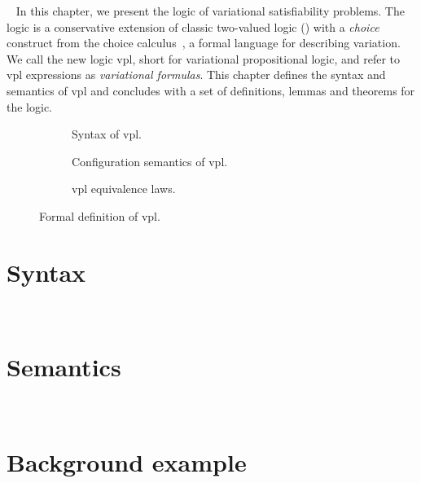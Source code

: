 ~\label{chapter:vpl}
%
In this chapter, we present the logic of variational satisfiability problems.
%
The logic is a conservative extension of classic two-valued logic (\pl{})
with a \emph{choice} construct from the choice
calculus~\cite{EW11tosem,Walk13thesis}, a formal language for describing
variation. We call the new logic \acs{vpl}, short for variational propositional
logic, and refer to \ac{vpl} expressions as \emph{variational formulas}.
%
This chapter defines the syntax and semantics of \ac{vpl} and concludes with a
set of definitions, lemmas and theorems for the logic.
%
\begin{figure}
  \begin{subfigure}[t]{\linewidth}
    \centering
    
    \caption{Syntax of \ac{vpl}.}%
    \label{fig:cc:stx}
  \end{subfigure}
%
  \begin{subfigure}[t]{\linewidth}
    
    \centering
    \caption{Configuration semantics of \ac{vpl}.}%
    \label{fig:cc:cfg}
  \end{subfigure}
%
  \begin{subfigure}[t]{\linewidth}
    
    \centering
    \caption{\ac{vpl} equivalence laws.}%
    \label{fig:cc:eqv}
  \end{subfigure}
\caption{Formal definition of \ac{vpl}.}%
\label{fig:cc}
\end{figure}
%
%
\section{Syntax}
~\label{section:syntax}


\section{Semantics}
~\label{section:semantics}

\section{Background example}
~\label{section:background}


